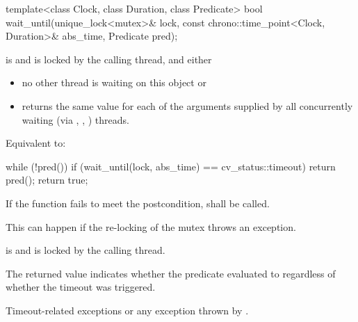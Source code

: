 %
\begin{itemdecl}
template<class Clock, class Duration, class Predicate>
  bool wait_until(unique_lock<mutex>& lock,
                  const chrono::time_point<Clock, Duration>& abs_time,
                  Predicate pred);
\end{itemdecl}
\begin{itemdescr}
 \pnum \requires {} is  and  is
                locked by the calling thread, and either

        \begin{itemize}
        \item no other thread is waiting on this  object or
        \item {} returns the same value for each of the 
                arguments supplied by all concurrently waiting (via ,
                , ) threads.
        \end{itemize}

 \pnum \effects Equivalent to:
\begin{codeblock}
while (!pred())
  if (wait_until(lock, abs_time) == cv_status::timeout)
    return pred();
return true;
\end{codeblock}

 \pnum \remarks
        If the function fails to meet the postcondition, 
        shall be called.
        \begin{note} This can happen if the re-locking of the mutex throws an exception. \end{note}

 \pnum \postconditions {} is  and 
        is locked by the calling thread.

 \pnum \begin{note} The returned value indicates whether the predicate evaluated to
         regardless of whether the timeout was triggered. \end{note}

 \pnum \throws Timeout-related exceptions or any exception thrown by .
\end{itemdescr}



